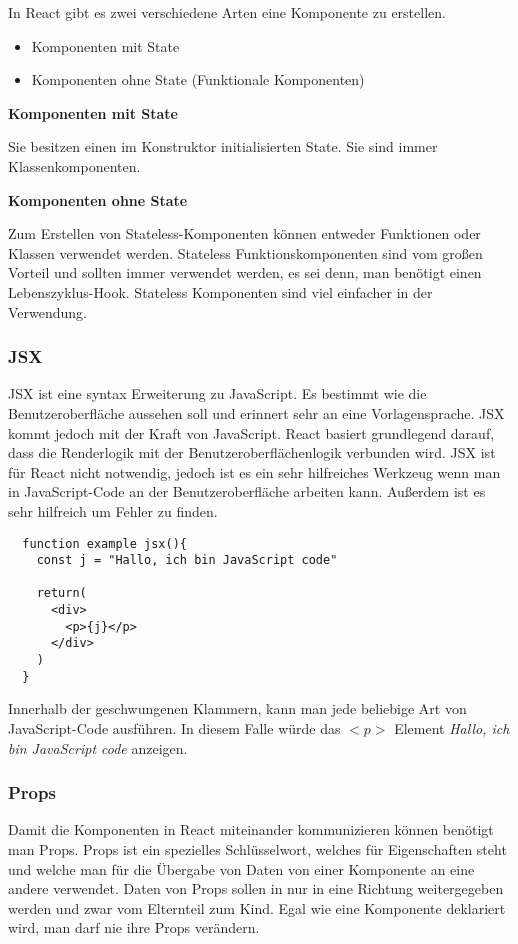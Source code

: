 In React gibt es zwei verschiedene Arten eine Komponente zu erstellen.
\begin{itemize}
  \item Komponenten mit State
  \item Komponenten ohne State (Funktionale Komponenten)\\
\end{itemize}

\centerline{\textbf{Komponenten mit State}}
Sie besitzen einen im Konstruktor initialisierten State. Sie sind immer Klassenkomponenten.\\

\centerline{\textbf{Komponenten ohne State}}
Zum Erstellen von Stateless-Komponenten können entweder Funktionen oder Klassen verwendet werden.
Stateless Funktionskomponenten sind vom großen Vorteil und sollten immer verwendet werden, es sei 
denn, man benötigt einen Lebenszyklus-Hook. Stateless Komponenten sind viel einfacher in der
Verwendung.\cite{KompState} 

\subsubsection{JSX}
\label{jsx}
JSX ist eine syntax Erweiterung zu JavaScript. Es bestimmt wie die Benutzeroberfläche aussehen soll
und erinnert sehr an eine Vorlagensprache. JSX kommt jedoch mit der Kraft von JavaScript. React basiert 
grundlegend darauf, dass die Renderlogik mit der Benutzeroberflächenlogik verbunden wird. JSX ist 
für React nicht notwendig, jedoch ist es ein sehr hilfreiches Werkzeug wenn man in JavaScript-Code an 
der Benutzeroberfläche arbeiten kann. Außerdem ist es sehr hilfreich um Fehler zu finden.
\begin{lstlisting}
  function example jsx(){
    const j = "Hallo, ich bin JavaScript code"

    return(
      <div>
        <p>{j}</p>
      </div>
    )
  }
\end{lstlisting}
Innerhalb der geschwungenen Klammern, kann man jede beliebige Art von JavaScript-Code ausführen.
In diesem Falle würde das $<p>$ Element \textit{Hallo, ich bin JavaScript code} anzeigen.
~\cite{JSX}

\subsubsection{Props}

 Damit die Komponenten in React miteinander kommunizieren können benötigt man Props. Props ist ein
 spezielles Schlüsselwort, welches für Eigenschaften steht und welche man für die Übergabe von 
 Daten von einer Komponente an eine andere verwendet. Daten von Props sollen in nur in eine 
 Richtung weitergegeben werden und zwar vom Elternteil zum Kind. Egal wie eine Komponente 
 deklariert wird, man darf nie ihre Props verändern.\\

